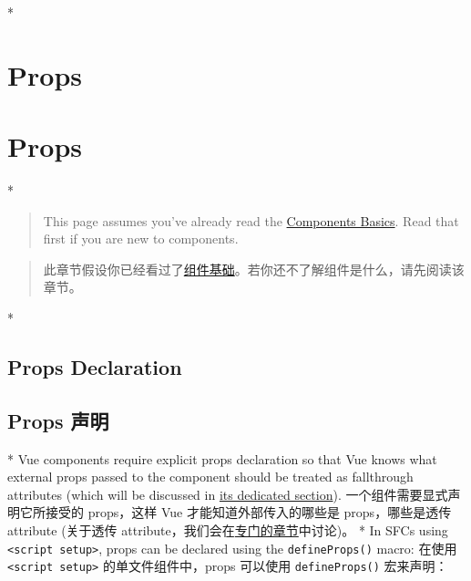 \begin{paracol}{2}
\switchcolumn[0]*%
\section{Props}
\switchcolumn
\section{Props}
\switchcolumn[0]*%
\begin{quote}
This page assumes you've already read the
\href{https://vuejs.org/guide/essentials/component-basics.html}{Components
Basics}. Read that first if you are new to components.
\end{quote}
\switchcolumn
\begin{quote}
此章节假设你已经看过了\href{https://cn.vuejs.org/guide/essentials/component-basics.html}{组件基础}。若你还不了解组件是什么，请先阅读该章节。
\end{quote}


\switchcolumn[0]*%
\subsection{Props Declaration}
\switchcolumn
\subsection{Props 声明}
\switchcolumn[0]*%
Vue components require explicit props declaration so that Vue knows what
external props passed to the component should be treated as fallthrough
attributes (which will be discussed in
\href{https://vuejs.org/guide/components/attrs.html}{its dedicated
section}).
\switchcolumn
一个组件需要显式声明它所接受的 props，这样 Vue 才能知道外部传入的哪些是
props，哪些是透传 attribute (关于透传
attribute，我们会在\href{https://cn.vuejs.org/guide/components/attrs.html}{专门的章节}中讨论)。
\switchcolumn[0]*%
In SFCs using \texttt{\textless{}script\ setup\textgreater{}}, props can
be declared using the \texttt{defineProps()} macro:
\switchcolumn
在使用 \texttt{\textless{}script\ setup\textgreater{}}
的单文件组件中，props 可以使用 \texttt{defineProps()} 宏来声明：


\end{paracol}
